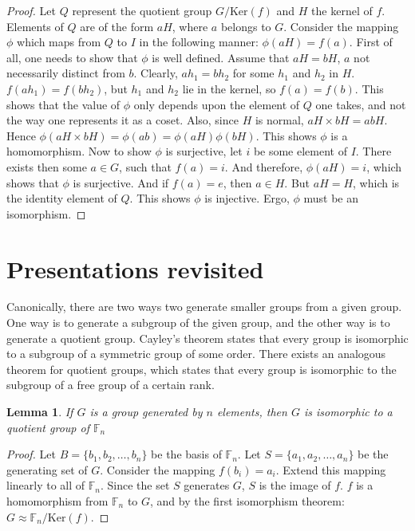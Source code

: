 \documentclass[12pt, titlepage]{article}
\newtheorem{lem}[thm]{Lemma}
\theoremstyle{definition}
\begin{document}
\begin{proof}
Let $Q$ represent the quotient group $G/\mathrm{Ker}(f)$ and $H$ the kernel of $f$. Elements of $Q$ are of the form $aH$, where $a$ belongs to $G$. Consider the mapping $\phi$ which maps from $Q$ to $I$ in the following manner: $\phi(aH) = f(a)$. First of all, one needs to show that $\phi$ is well defined. Assume that $aH=bH$, $a$ not necessarily distinct from $b$. Clearly, $ah_1=bh_2$ for some $h_1$ and $h_2$ in $H$. $f(ah_1)=f(bh_2)$, but $h_1$ and $h_2$ lie in the kernel, so $f(a)=f(b)$. This shows that the value of $\phi$ only depends upon the element of $Q$ one takes, and not the way one represents it as a coset. Also, since $H$ is normal, $aH \times bH=abH$. Hence $\phi(aH \times bH) = \phi(ab) = \phi(aH)\phi(bH)$. This shows $\phi$ is a homomorphism. Now to show $\phi$ is surjective, let $i$ be some element of $I$. There exists then some $a \in G$, such that $f(a)=i$. And therefore, $\phi(aH)=i$, which shows that $\phi$ is surjective. And if $f(a)=e$, then $a \in H$. But $aH=H$, which is the identity element of $Q$. This shows $\phi$ is injective. Ergo, $\phi$ must be an isomorphism.
\end{proof}

\section{Presentations revisited}

Canonically, there are two ways two generate smaller groups from a given group. One way is to generate a subgroup of the given group, and the other way is to generate a quotient group. Cayley's theorem states that every group is isomorphic to a subgroup of a symmetric group of some order. There exists an analogous theorem for quotient groups, which states that every group is isomorphic to the subgroup of a free group of a certain rank.

\begin{lem}\cite{meier}\label{quotient}
If $G$ is a group generated by $n$ elements, then $G$ is isomorphic to a quotient group of $\mathbb{F}_n$
\end{lem}

\begin{proof}
Let $B= \{b_1, b_2, \ldots , b_n\}$ be the basis of $\mathbb{F}_n$. Let $S=\{a_1, a_2, \ldots, a_n\}$ be the generating set of $G$. Consider the mapping $f(b_i)=a_i$. Extend this mapping linearly to all of $\mathbb{F}_n$. Since the set $S$ generates $G$, $S$ is the image of $f$. $f$ is a homomorphism from $\mathbb{F}_n$ to $G$, and by the first isomorphism theorem: $G \approx \mathbb{F}_n/\mathrm{Ker}(f)$. 
\end{proof}
\end{document}
